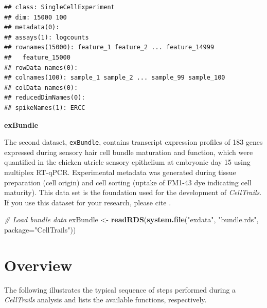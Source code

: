 \documentclass[]{book}
\newenvironment{Shaded}{\begin{snugshade}}{\end{snugshade}}
\newcommand{\KeywordTok}[1]{\textcolor[rgb]{0.13,0.29,0.53}{\textbf{#1}}}
\newcommand{\DataTypeTok}[1]{\textcolor[rgb]{0.13,0.29,0.53}{#1}}
\newcommand{\StringTok}[1]{\textcolor[rgb]{0.31,0.60,0.02}{#1}}
\newcommand{\CommentTok}[1]{\textcolor[rgb]{0.56,0.35,0.01}{\textit{#1}}}
\newcommand{\NormalTok}[1]{#1}
\theoremstyle{definition}
\theoremstyle{definition}
\theoremstyle{definition}
\theoremstyle{remark}
\begin{document}
\begin{verbatim}
## class: SingleCellExperiment 
## dim: 15000 100 
## metadata(0):
## assays(1): logcounts
## rownames(15000): feature_1 feature_2 ... feature_14999
##   feature_15000
## rowData names(0):
## colnames(100): sample_1 sample_2 ... sample_99 sample_100
## colData names(0):
## reducedDimNames(0):
## spikeNames(1): ERCC
\end{verbatim}

\textbf{exBundle}

The second dataset, \texttt{exBundle}, contains transcript expression
profiles of 183 genes expressed during sensory hair cell bundle
maturation and function, which were quantified in the chicken utricle
sensory epithelium at embryonic day 15 using multiplex RT-qPCR.
Experimental metadata was generated during tissue preparation (cell
origin) and cell sorting (uptake of FM1-43 dye indicating cell
maturity). This data set is the foundation used for the development of
\emph{CellTrails}. If you use this dataset for your research, please
cite \citet{ellwanger2018}.

\begin{Shaded}
\begin{Highlighting}[]
\CommentTok{# Load bundle data}
\NormalTok{exBundle <-}\StringTok{ }\KeywordTok{readRDS}\NormalTok{(}\KeywordTok{system.file}\NormalTok{(}\StringTok{"exdata"}\NormalTok{, }\StringTok{"bundle.rds"}\NormalTok{, }\DataTypeTok{package=}\StringTok{"CellTrails"}\NormalTok{))}
\end{Highlighting}
\end{Shaded}

\chapter{Overview}\label{overview}

The following illustrates the typical sequence of steps performed during
a \emph{CellTrails} analysis and lists the available functions,
respectively.
\end{document}
